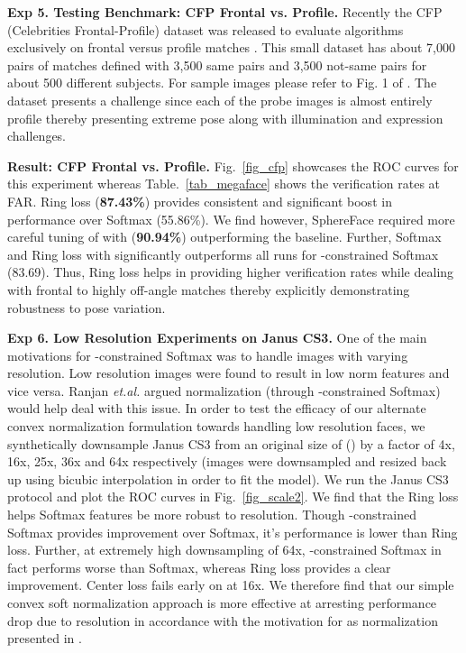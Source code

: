 \documentclass[10pt,twocolumn,letterpaper]{article}
\begin{document}
\textbf{Exp 5. Testing Benchmark: CFP Frontal vs. Profile. } Recently the CFP (Celebrities Frontal-Profile) dataset was released to evaluate algorithms exclusively on frontal versus profile matches \cite{sengupta2016frontal}. This small dataset has about 7,000 pairs of matches defined with 3,500 same pairs and 3,500 not-same pairs for about 500 different subjects. For sample images please refer to Fig. 1 of \cite{sengupta2016frontal}. The dataset presents a challenge since each of the probe images is almost entirely profile thereby presenting extreme pose along with illumination and expression challenges. 



\textbf{Result: CFP Frontal vs. Profile.} Fig.~\ref{fig_cfp} showcases the ROC curves for this experiment whereas Table.~\ref{tab_megaface} shows the verification rates at  FAR.  Ring loss (\textbf{87.43\%}) provides consistent and significant boost in performance over Softmax (55.86\%). We find however, SphereFace required more careful tuning of  with  (\textbf{90.94\%}) outperforming the baseline. Further, Softmax and Ring loss with  significantly outperforms all runs for -constrained Softmax \cite{ranjan2017l2} (83.69). Thus, Ring loss helps in providing higher verification rates while dealing with frontal to highly off-angle matches thereby explicitly demonstrating robustness to pose variation.





\textbf{Exp 6. Low Resolution Experiments on Janus CS3. } One of the main motivations for -constrained Softmax was to handle images with varying resolution. Low resolution images were found to result in low norm features and vice versa. Ranjan \emph{et.al.}  \cite{ranjan2017l2} argued normalization (through -constrained Softmax) would help deal with this issue. In order to test the efficacy of our alternate convex normalization formulation towards handling low resolution faces, we synthetically downsample Janus CS3 from an original size of () by a factor of 4x, 16x, 25x, 36x and 64x respectively (images were downsampled and resized back up using bicubic interpolation in order to fit the model). We run the Janus CS3 protocol and plot the ROC curves in Fig.~\ref{fig_scale2}. We find that the Ring loss helps Softmax features be more robust to resolution. Though -constrained Softmax provides improvement over Softmax, it's performance is lower than Ring loss. Further, at extremely high downsampling of 64x, -constrained Softmax in fact performs worse than Softmax, whereas Ring loss provides a clear improvement. Center loss fails early on at 16x. We therefore find that our simple convex soft normalization approach is more effective at arresting performance drop due to resolution in accordance with the motivation for as normalization presented in \cite{ranjan2017l2}.
\end{document}
